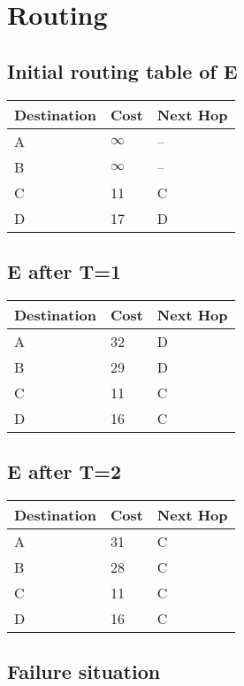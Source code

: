 \section{Routing}
\subsection{Initial routing table of E}
\begin{tabular}{| l | l | l |}
    \hline
    Destination & Cost & Next Hop \\ \hline
    A & $\infty$ & -- \\ \hline
    B & $\infty$ & -- \\ \hline
    C & 11 & C \\ \hline
    D & 17 & D \\ \hline
\end{tabular}
\subsection{E after T=1}
\begin{tabular}{| l | l | l |}
    \hline
    Destination & Cost & Next Hop \\ \hline
    A & 32 & D \\ \hline
    B & 29 & D \\ \hline
    C & 11 & C \\ \hline
    D & 16 & C \\ \hline
\end{tabular}
\subsection{E after T=2}
\begin{tabular}{| l | l | l |}
    \hline
    Destination & Cost & Next Hop \\ \hline
    A & 31 & C \\ \hline
    B & 28 & C \\ \hline
    C & 11 & C \\ \hline
    D & 16 & C \\ \hline
\end{tabular}
\subsection{Failure situation}
